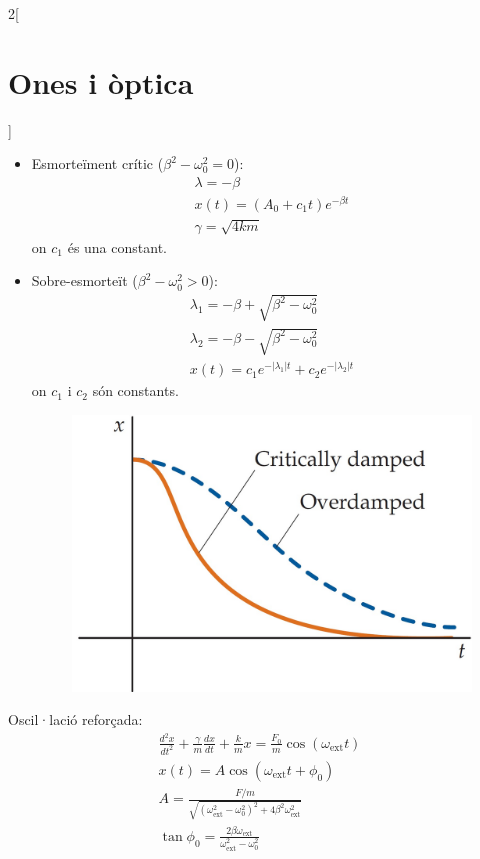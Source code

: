 \documentclass[class=article,10pt,crop=false]{standalone}
\begin{document}
\begin{multicols}{2}[\section{Ones i òptica}]
\begin{itemize}
\begin{figure}
    \end{figure}
    \item Esmorteïment crític ($\beta^2 -\omega_0^2=0$):
    \begin{gather*}
    \lambda=-\beta\\
    x(t)=(A_0+c_1t)e^{-\beta t}\\
    \gamma=\sqrt{4km}
\end{gather*}
{\footnotesize on $c_1$ és una constant.}
    \item Sobre-esmorteït ($\beta^2-\omega_0^2>0$):
    \begin{gather*}
    \lambda_1=-\beta+\sqrt{\beta^2-\omega_0^2}\\
    \lambda_2=-\beta-\sqrt{\beta^2-\omega_0^2}\\
    x(t)=c_1e^{-|\lambda_1|t}+c_2e^{-|\lambda_2|t}
\end{gather*}
{\footnotesize on $c_1$ i $c_2$ són constants.}\newline
    \begin{figure}
       \centering
       \includegraphics[width=\linewidth]{Physics/1st/Ones_i_optica/Imatges/cdamp.jpg}
    \end{figure}
\end{itemize}
Oscil·lació reforçada:
\begin{gather*}
    \frac{d^2x}{dt^2}+\frac{\gamma}{m}\frac{dx}{dt}+\frac{k}{m}x=\frac{F_0}{m}\cos(\omega_{\text{ext}}t)\\
    x(t)=A\cos(\omega_\text{ext}t+\phi_0)\\
    A=\frac{F/m}{\sqrt{(\omega_{\text{ext}}^2-\omega_0^2)^2+4\beta^2\omega_\text{ext}^2}}\\
    \tan\phi_0=\frac{2\beta\omega_{\text{ext}}}{\omega_{\text{ext}}^2-\omega_0^2}

\end{gather*}
\end{multicols}
\end{document}
